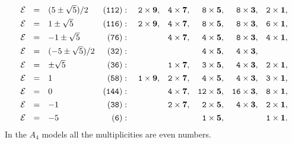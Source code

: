 \documentclass[a4paper,12pt]{article}
\begin{document}
\begin{equation}
\begin{array}{llrrrrrr}
{\cal E}\ \ =&{(5\pm\sqrt{5})/2}&({\tt 112}):&{\tt 2} \times {\bf 9},&
{\tt 4} \times {\bf 7},& {\tt 8} \times {\bf 5},& {\tt 8} \times {\bf
3},& {\tt 2} \times {\bf 1},\\[4pt]
{\cal E}\ \ =&{1\pm\sqrt{5}}& ({\tt 116}):& {\tt 2} \times
{\bf 9},& {\tt 4} \times {\bf 7},& {\tt 8} \times {\bf 5},&
{\tt 8} \times {\bf 3},& {\tt 6} \times {\bf 1},\\[4pt]
{\cal E}\ \ =&{-1\pm\sqrt{5}}& ({\tt 76}):&  &{\tt 4}
\times {\bf 7},& {\tt 4} \times {\bf 5},& {\tt 8} \times {\bf
3},& {\tt 4} \times {\bf 1},\\[4pt]
{\cal E}\ \ =&{(-5\pm\sqrt{5})/2}& ({\tt 32}):& &
& {\tt 4} \times {\bf 5},&
{\tt 4}
\times {\bf 3},& \\[4pt]
{\cal E}\ \ =&{\pm\sqrt{5}}& ({\tt 36}):& & {\tt 1} \times
{\bf 7},&{\tt 3} \times {\bf 5},& {\tt 4} \times {\bf 3},&
{\tt 2} \times {\bf 1},\\[4pt]
{\cal E}\ \ =&1 & ({\tt
58}):&\ {\tt 1}
\times {\bf 9},& {\tt 2} \times {\bf 7},& {\tt 4} \times {\bf
5},& {\tt 4} \times {\bf 3},& {\tt 3} \times {\bf 1},\\[4pt]
{\cal E}\ \ =&0& ({\tt 144}):& &  {\tt 4} \times {\bf
7},& {\tt 12} \times {\bf 5},& {\tt 16}
\times {\bf 3},& {\tt 8} \times {\bf 1},\\[4pt]
{\cal E}\ \ =&-1& ({\tt 38}):& &  {\tt 2} \times {\bf
7},& {\tt 2} \times {\bf 5},& {\tt 4}
\times {\bf 3},& {\tt 2} \times {\bf 1},\\[4pt]
{\cal E}\ \ =&{-5}& ({\tt 6}):& && {\tt 1}
\times {\bf 5},&
&{\tt 1} \times {\bf 1}.\nonumber
\end{array}
\end{equation}
In the $A_4$ models all the multiplicities are even numbers.
\end{document}
